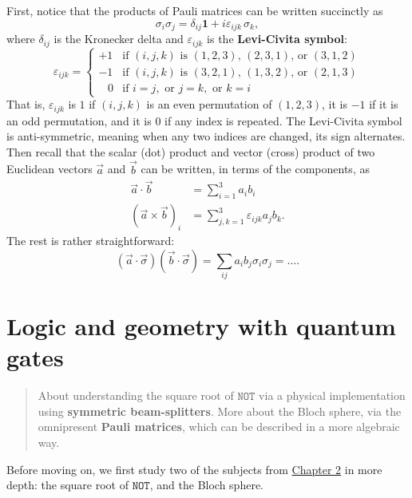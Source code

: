 \documentclass[fleqn]{article}
\let\oldsection\section
\renewcommand\section{\clearpage\oldsection}
\begin{document}
\begin{enumerate}
  First, notice that the products of Pauli matrices can be written succinctly as
  \[
    \sigma_{i}\sigma_{j}
    = \delta _{ij}\mathbf{1}+ i\varepsilon_{ijk}\,\sigma _{k},
   \]
  where \(\delta_{ij}\) is the Kronecker delta and \(\varepsilon_{ijk}\) is the \textbf{Levi-Civita symbol}:
  \[
    \varepsilon_{ijk}
    = \begin{cases}
     +1 & {\text{if }}(i,j,k){\text{ is }}(1,2,3)\text{, }(2,3,1){\text{, or }}(3,1,2)
   \\-1 & {\text{if }}(i,j,k){\text{ is }}(3,2,1)\text{, }(1,3,2){\text{, or }}(2,1,3)
   \\\;\;\;0 & {\text{if }}i=j,{\text{ or }}j=k,{\text{ or }}k=i
   \end{cases}
   \]
  That is, \(\varepsilon _{ijk}\) is \(1\) if \((i, j, k)\) is an even permutation of \((1, 2, 3)\), it is \(-1\) if it is an odd permutation, and it is \(0\) if any index is repeated.
  The Levi-Civita symbol is anti-symmetric, meaning when any two indices are changed, its sign alternates.
  Then recall that the scalar (dot) product and vector (cross) product of two Euclidean vectors \(\vec{a}\) and \(\vec{b}\) can be written, in terms of the components, as
  \[
     \begin{aligned}
       \vec{a}\cdot\vec{b}
       &= \sum_{i=1}^3 a_i b_i
     \\(\vec{a}\times\vec{b})_i
       &= \sum_{j,k=1}^3 \varepsilon_{ijk}a_jb_k.
     \end{aligned}
   \]
  The rest is rather straightforward:
  \[
     (\vec{a}\cdot\vec{\sigma})(\vec{b}\cdot\vec{\sigma})
     = \sum_{ij}a_i b_j\sigma_i\sigma_j
     = \ldots.
   \]
\end{enumerate}

\hypertarget{chapter3}{%
\section{Logic and geometry with quantum gates}\label{chapter3}}

\begin{quote}
About understanding the square root of \(\texttt{NOT}\) via a physical implementation using \textbf{symmetric beam-splitters}.
More about the Bloch sphere, via the omnipresent \textbf{Pauli matrices}, which can be described in a more algebraic way.
\end{quote}

Before moving on, we first study two of the subjects from \protect\hyperlink{chapter2}{Chapter 2} in more depth: the square root of \(\texttt{NOT}\), and the Bloch sphere.
\end{document}
